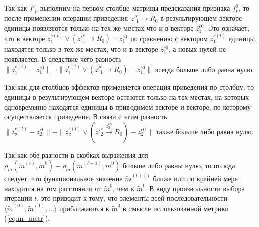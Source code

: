 \begin{Proof}
	Так как $f'_p$ выполним на первом столбце матрицы предсказания признака $f_p^0$, то после применении операции приведения $\bar z'^c_1\rightarrow R_0$ в результирующем векторе единицы появляются только на тех же местах что и в векторе $\bar z_1^{c0}$. Это означает, что в векторе $\bar z_1^{c(t)}\vee (\bar z'^c_1\rightarrow R_0)-\bar z_1^{c0}$ по сравнению с вектором $\bar z_1^{c(t)}$  единицы находятся только в тех же местах, что и в векторе $\bar z_1^{c0}$, а новых нулей не появляется. В следствие чего разность $\|\bar z_1^{c(t)}-\bar z_1^{c0}\|-\|\bar z_1^{c(t)}\vee (\bar z'^c_1\rightarrow R_0)-\bar z_1^{c0}\|$ всегда больше либо равна нулю.
	
	Так как для столбцов эффектов применяется операция приведения по столбцу, то единицы в результирующем векторе остаются только на тех местах, на которых одновременно находятся единицы в приводимом векторе и векторе, по которому осуществляется приведение. В связи с этим разность $\|\bar z_2^{e(t)}-\bar z_2^{e0}\|-\|\bar z_2^{e(t)}\vee (\bar z'^e_2\xrightarrow{\bar z_2^{e0}} R_0)-\bar z_2^{e0}\|$ также больше либо равна нулю.
	
	Так как обе разности в скобках выражения для $\rho_m(\tilde m^{(t)},\tilde m^0)-\rho_m(\tilde m^{(t+1)},\tilde m^0)$ больше либо равны нулю, то отсюда следует, что функциональное значение $\tilde m^{(t+1)}$ ближе или по крайней мере находится на том расстоянии от $\tilde m^0$, чем к $\tilde m^{t}$. В виду произвольности выбора итерации $t$, это приводит к тому, что элементы всей последовательности $\langle\tilde m^{(0)},\tilde m^{(1)},\dots\rangle$ приближаются к $\tilde m^0$ в смысле использованной метрики (\ref{eq:m_metr}). 
\end{Proof}



\clearpage